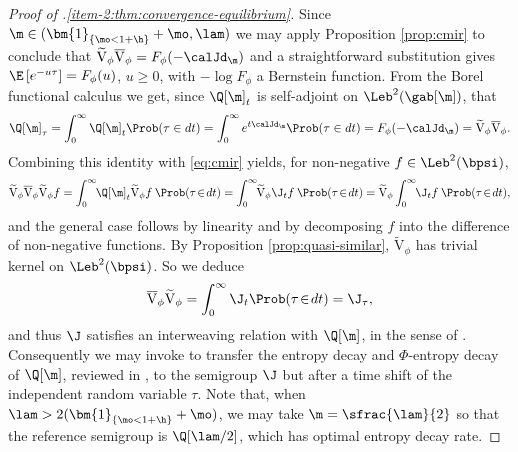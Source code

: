 \begin{proof}[Proof of .\eqref{item-2:thm:convergence-equilibrium}]
Since $\m \in (\bm{1}_{\{\mo < 1+\h\}} + \mo, \lam)$ we may apply Proposition \ref{prop:cmir} to conclude that $\widetilde{\mathrm{V}}_\phi \overline{\mathrm{V}}_\phi = F_\phi(-\calJd_{\m})$ and a straightforward substitution gives $\E\left[e^{-u\tau}\right] = F_\phi(u)$, $u \geq 0$, with $-\log F_\phi$ a Bernstein function. From the Borel functional calculus we get, since $\Q[\m]_t$ is self-adjoint on $\Leb^2(\gab[\m])$, that
\begin{equation*}
\Q[\m]_\tau = \int_0^\infty \Q[\m]_t \Prob(\tau \in dt) = \int_0^\infty e^{t\calJd_{\m}} \Prob(\tau \in dt) = F_\phi(-\calJd_{\m}) = \widetilde{\mathrm{V}}_\phi \overline{\mathrm{V}}_\phi.
\end{equation*}
Combining this identity with \eqref{eq:cmir} yields, for non-negative $f \in \Leb^2(\bpsi)$,
\begin{equation*}
\widetilde{\mathrm{V}}_\phi \overline{\mathrm{V}}_\phi \widetilde{\mathrm{V}}_\phi f = \int_0^\infty\hspace*{-1mm} \Q[\m]_t \widetilde{\mathrm{V}}_\phi f \: \Prob(\tau\!\in\!dt) = \int_0^\infty\hspace*{-1mm} \widetilde{\mathrm{V}}_\phi \J_t f \: \Prob(\tau\!\in\!dt) = \widetilde{\mathrm{V}}_\phi \int_0^\infty\hspace*{-1mm} \J_t f \: \Prob(\tau\!\in\!dt),
\end{equation*}
and the general case follows by linearity and by decomposing $f$ into the difference of non-negative functions. By Proposition \ref{prop:quasi-similar}, $\widetilde{\mathrm{V}}_\phi$ has trivial kernel on $\Leb^2(\bpsi)$. So we deduce
\begin{equation}
\label{eq:J-tau}
\overline{\mathrm{V}}_\phi \widetilde{\mathrm{V}}_\phi = \int_0^\infty \J_t \Prob(\tau\!\in\!dt) = \J_\tau,
\end{equation}
and thus $\J$ satisfies an interweaving relation with $\Q[\m]$, in the sense of \cite{Patie-Miclo}. Consequently we may invoke \cite[Ths.\,7, 24]{Patie-Miclo} to transfer the entropy decay and $\Phi$-entropy decay of $\Q[\m]$, reviewed in , to the semigroup $\J$ but after a time shift of the independent random variable $\tau$. Note that, when $\lam > 2(\bm{1}_{\{\mo < 1+\h\}} + \mo)$, we may take $\m = \sfrac{\lam}{2}$ so that the reference semigroup is $\Q[\lam/2]$, which has optimal entropy decay rate.
\end{proof}


